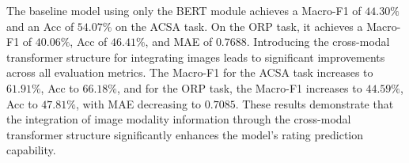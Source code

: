 \documentclass[preprint,12pt]{elsarticle}
\begin{document}
\begin{table}[htp]
	\centering
	\caption{Ablation experiment results for structure design}
	\label{table:asap_structure}
\end{table}


The baseline model using only the BERT module achieves a Macro-F1 of $44.30\%$ and an Acc of $54.07\%$ on the ACSA task. On the ORP task, it achieves a Macro-F1 of $40.06\%$, Acc of $46.41\%$, and MAE of $0.7688$. Introducing the cross-modal transformer structure for integrating images leads to significant improvements across all evaluation metrics. The Macro-F1 for the ACSA task increases to $61.91\%$, Acc to $66.18\%$, and for the ORP task, the Macro-F1 increases to $44.59\%$, Acc to $47.81\%$, with MAE decreasing to $0.7085$. These results demonstrate that the integration of image modality information through the cross-modal transformer structure significantly enhances the model's rating prediction capability.
\end{document}
